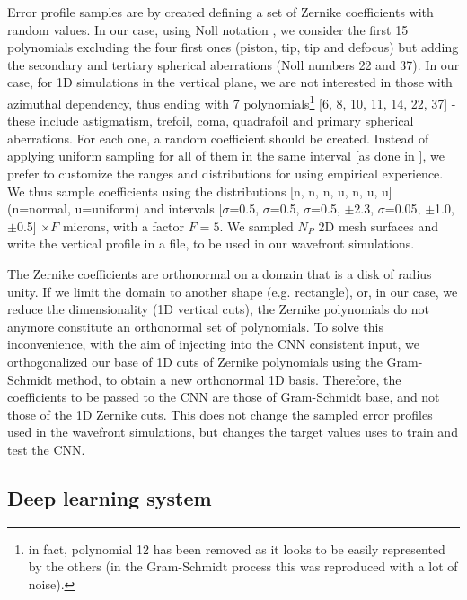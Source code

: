 \documentclass[preprint]{iucr}
\newcommand{\inred}[1]{{\color{red}#1}}
\begin{document}
Error profile samples are by created defining a set of Zernike coefficients with random values. In our case, using Noll notation \cite{Noll:76}, we consider the first 15 polynomials excluding the four first ones (piston, tip, tip and defocus) but adding the secondary and \inred{tertiary} spherical aberrations (Noll numbers 22 and 37). In our case, for 1D simulations in the vertical plane, we are not interested in those with azimuthal dependency, thus ending with 7 polynomials\footnote{in fact, polynomial 12 has been removed as it looks to be easily represented by the others (in the Gram-Schmidt process this was reproduced with a lot of noise). } [6, 8, 10, 11, 14, 22, 37] - \inred{these include astigmatism, trefoil, coma, quadrafoil and primary spherical aberrations}. For each one, a random coefficient should be created. Instead of applying uniform sampling for all of them in the same interval [as done in \cite{Saha2020}], we prefer to customize the ranges and distributions for using empirical experience. We thus sample coefficients using the distributions [n, n, n, u, n, u, u]  (n=normal, u=uniform) and intervals [$\sigma$=0.5, $\sigma$=0.5, $\sigma$=0.5, $\pm$2.3, $\sigma$=0.05, $\pm$1.0, $\pm$0.5] $\times F$ microns, with a factor $F=5$. We sampled $N_P$ 2D mesh surfaces and write the vertical profile in a file, to be used in our wavefront simulations.

The Zernike coefficients are orthonormal on a domain that is a disk of radius unity. If we limit the domain to another shape (e.g. rectangle), or, in our case, we reduce the dimensionality (1D vertical cuts), the Zernike polynomials do not anymore constitute an orthonormal set of polynomials. To solve this inconvenience, with the aim of injecting into the CNN consistent input, we orthogonalized our base of 1D cuts of Zernike polynomials using the Gram-Schmidt method, to obtain a new orthonormal 1D basis. Therefore, the coefficients to be passed to the CNN are those of Gram-Schmidt base, and not those of the 1D Zernike cuts. This does not change the sampled error profiles used in the wavefront simulations, but changes the target values uses to train and test the CNN.  

\subsection{Deep learning system}
\end{document}
